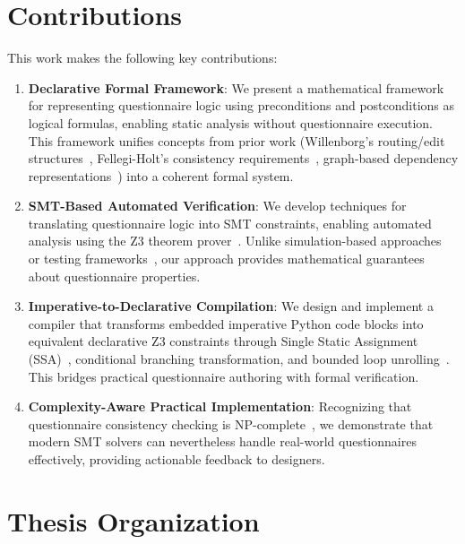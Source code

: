 \section{Contributions}

This work makes the following key contributions:

\begin{enumerate}
    \item \textbf{Declarative Formal Framework}: We present a mathematical framework for representing questionnaire logic using preconditions and postconditions as logical formulas, enabling static analysis without questionnaire execution. This framework unifies concepts from prior work (Willenborg's routing/edit structures~\cite{willenborg1988computational}, Fellegi-Holt's consistency requirements~\cite{fellegi1976systematic}, graph-based dependency representations~\cite{fagan1988census,elliott2012application}) into a coherent formal system.
    
    \item \textbf{SMT-Based Automated Verification}: We develop techniques for translating questionnaire logic into SMT constraints, enabling automated analysis using the Z3 theorem prover~\cite{demoura2008z3}. Unlike simulation-based approaches~\cite{feeney2019logical} or testing frameworks~\cite{elliott2012application}, our approach provides mathematical guarantees about questionnaire properties.
    
    \item \textbf{Imperative-to-Declarative Compilation}: We design and implement a compiler that transforms embedded imperative Python code blocks into equivalent declarative Z3 constraints through Single Static Assignment (SSA)~\cite{cytron1991efficiently}, conditional branching transformation, and bounded loop unrolling~\cite{clarke2001bounded}. This bridges practical questionnaire authoring with formal verification.
    
    \item \textbf{Complexity-Aware Practical Implementation}: Recognizing that questionnaire consistency checking is NP-complete~\cite{willenborg1995testing}, we demonstrate that modern SMT solvers can nevertheless handle real-world questionnaires effectively, providing actionable feedback to designers.
\end{enumerate}

\section{Thesis Organization}

